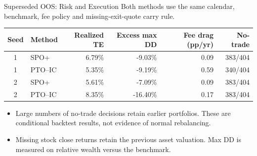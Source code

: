 \documentclass[aspectratio=169,xcolor=dvipsnames]{beamer}
\begin{document}
\begin{frame}{Superseded OOS: Risk and Execution}
    \small Both methods use the same calendar, benchmark, fee policy and
    missing-exit-quote carry rule.
    \vspace{8pt}
    \begin{table}
    \centering\small\setlength{\tabcolsep}{8pt}
    \begin{tabular}{c l r r r r}
    \toprule
    Seed & Method & Realized TE & Excess max DD & Fee drag (pp/yr) & No-trade \\
    \midrule
1 & SPO+ & 6.79\% & -9.03\% & 0.09 & 383/404 \\
1 & PTO--IC & 5.35\% & -9.19\% & 0.59 & 340/404 \\
2 & SPO+ & 5.61\% & -7.09\% & 0.09 & 383/404 \\
2 & PTO--IC & 8.35\% & -16.40\% & 0.17 & 383/404 \\
    \bottomrule
    \end{tabular}
    \end{table}
    \vspace{7pt}
    \begin{itemize}
    \item Large numbers of no-trade decisions retain earlier portfolios.
    These are conditional backtest results, not evidence of normal rebalancing.
    \item Missing stock close returns retain the previous asset valuation.
    Max DD is measured on relative wealth versus the benchmark.
    \end{itemize}
\end{frame}
\end{document}

